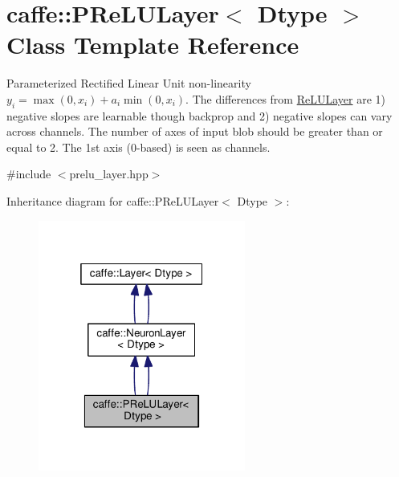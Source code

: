 \hypertarget{classcaffe_1_1_p_re_l_u_layer}{}\section{caffe\+:\+:P\+Re\+L\+U\+Layer$<$ Dtype $>$ Class Template Reference}
\label{classcaffe_1_1_p_re_l_u_layer}


Parameterized Rectified Linear Unit non-\/linearity $ y_i = \max(0, x_i) + a_i \min(0, x_i) $. The differences from \mbox{\hyperlink{classcaffe_1_1_re_l_u_layer}{Re\+L\+U\+Layer}} are 1) negative slopes are learnable though backprop and 2) negative slopes can vary across channels. The number of axes of input blob should be greater than or equal to 2. The 1st axis (0-\/based) is seen as channels.  




{\ttfamily \#include $<$prelu\+\_\+layer.\+hpp$>$}



Inheritance diagram for caffe\+:\+:P\+Re\+L\+U\+Layer$<$ Dtype $>$\+:
\nopagebreak
\begin{figure}[H]
\begin{center}
\leavevmode
\includegraphics[width=193pt]{classcaffe_1_1_p_re_l_u_layer__inherit__graph}
\end{center}
\end{figure}

